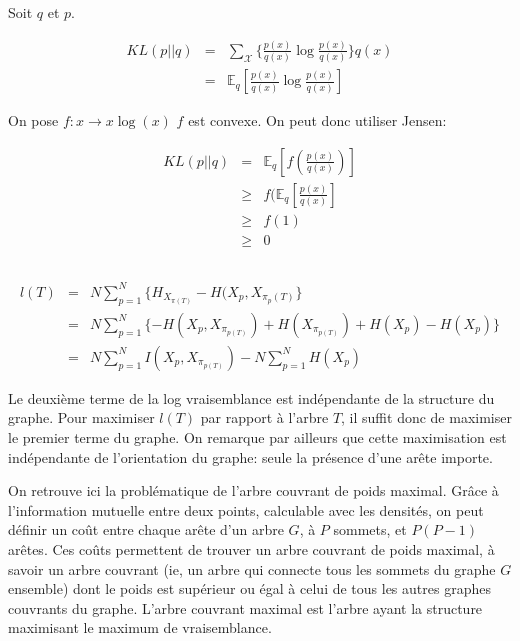 \documentclass{article}
\begin{document}
Soit $q$ et $p$.

\begin{align}
KL(p || q) & = & \sum_{\mathcal{X}} \{ \frac{p(x)}{q(x)} \log \frac{p(x)}{q(x)} \} q(x) \\
	   & = & \mathbb{E}_q [\frac{p(x)}{q(x)} \log \frac{p(x)}{q(x)}]
\end{align}


On pose $f: x \rightarrow x \log(x)$
$f$ est convexe. On peut donc utiliser Jensen:

\begin{align}
KL(p || q) & = & \mathbb{E}_q [f(\frac{p(x)}{q(x)})] \\
	   & \geq & f( \mathbb{E}_q[\frac{p(x)}{q(x)}] \\
	   & \geq & f(1) \\
	   & \geq & 0
\end{align}

\subsection{}

\begin{align}
l(T) & = & N \sum_{p=1}^N \{H_{X_{\pi(T)}} - H(X_p, X_{\pi_p(T)}\} \\
     & = & N \sum_{p=1}^N \{- H(X_p, X_{\pi_{p(T)}}) + H(X_{\pi_{p(T)}}) + H(X_p) - H(X_p)\} \\
     & = & N \sum_{p=1}^N I(X_p, X_{\pi_{p(T)}}) - N \sum_{p=1}^N H(X_p)
\end{align}


Le deuxième terme de la log vraisemblance est indépendante de la structure du
graphe. Pour maximiser $l(T)$ par rapport à l'arbre $T$, il suffit donc de
maximiser le premier terme du graphe. On remarque par ailleurs que cette
maximisation est indépendante de l'orientation du graphe: seule la présence
d'une arête importe.

On retrouve ici la problématique de l'arbre couvrant de poids maximal. Grâce à
l'information mutuelle entre deux points, calculable avec les densités, on peut
définir un coût entre chaque arête d'un arbre $G$, à $P$ sommets, et $P(P - 1)$
arêtes. Ces coûts permettent de trouver un arbre couvrant de poids maximal, à
savoir un arbre couvrant (ie, un arbre qui connecte tous les sommets du graphe
$G$ ensemble) dont le poids est supérieur ou égal à celui de tous les autres
graphes couvrants du graphe. L'arbre couvrant maximal est l'arbre ayant la
structure maximisant le maximum de vraisemblance.
\end{document}
